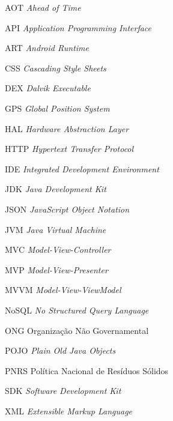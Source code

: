 \documentclass[
	12pt,				%
	openany,			%
	twoside,			%
	a4paper,			%
	english,			%
	french,				%
	spanish,			%
	brazil				%
	]{abntex2}
\begin{document}
\begin{siglas}

   \item[AOT] \textit{Ahead of Time}
   \item[API] \textit{Application Programming Interface}   
   \item[ART] \textit{Android Runtime}
   \item[CSS] \textit{Cascading Style Sheets}
   \item[DEX] \textit{Dalvik Executable}
   \item[GPS] \textit{Global Position System}
   \item[HAL] \textit{Hardware Abstraction Layer}
   \item[HTTP] \textit{Hypertext Transfer Protocol}
   \item[IDE] \textit{Integrated Development Environment}   
   \item[JDK] \textit{Java Development Kit}
   \item[JSON] \textit{JavaScript Object Notation}
   \item[JVM] \textit{Java Virtual Machine}
   \item[MVC] \textit{Model-View-Controller}
   \item[MVP] \textit{Model-View-Presenter}
   \item[MVVM] \textit{Model-View-ViewModel}   
   \item[NoSQL] \textit{No Structured Query Language}
   \item[ONG]  {Organização Não Governamental}
   \item[POJO] \textit{Plain Old Java Objects}
   \item[PNRS] {Política Nacional de Resíduos Sólidos}
   \item[SDK] \textit{Software Development Kit}
   \item[XML] \textit{Extensible Markup Language}
   
  
\end{siglas}



\end{document}
